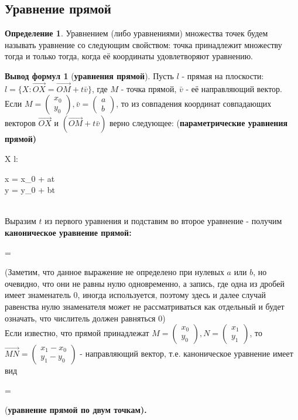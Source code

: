 \documentclass[a4paper, 12pt]{article}
\theoremstyle{definition}
\newtheorem*{definition}{Определение}
\newtheorem*{formulas}{Вывод формул}
\newenvironment{boxedalign*}
  {\begin{equation*}\begin{lrbox}{\boxedalignbox}$\begin{aligned}}
  {\end{aligned}$\end{lrbox}\fbox{\usebox{\boxedalignbox}}\end{equation*}}
\begin{document}
	\subsection{Уравнение прямой}
	\begin{definition}
		Уравнением (либо уравнениями) множества точек будем называть уравнение со следующим свойством: точка принадлежит множеству тогда и только тогда, когда её координаты удовлетворяют уравнению. 
	\end{definition}
	\begin{formulas}[\bfseries уравнения прямой\mdseries]


		Пусть $l$ - прямая на плоскости: $l = \{X: \overrightarrow{OX} = \overrightarrow{OM} + t\bar{v}\}$, где $M$ - точка прямой, $\bar{v}$ - её направляющий вектор. Если $M=\begin{pmatrix}x_{0}\\y_{0}\end{pmatrix},\bar{v}=\begin{pmatrix}a\\b\end{pmatrix}$, то из совпадения координат совпадающих векторов $\overrightarrow{OX}$ и $(\overrightarrow{OM}+t\bar{v})$ верно следующее: (\bfseries параметрические уравнения прямой\mdseries) \begin{boxedalign*}X \in l: \begin{cases}x = x_{0} + at \\ y = y_{0} + bt\end{cases}\end{boxedalign*}\\
		Выразим $t$ из первого уравнения и подставим во второе уравнение - получим \bfseries каноническое уравнение прямой\mdseries : \begin{boxedalign*} = \end{boxedalign*}
		(Заметим, что данное выражение не определено при нулевых $a$ или $b$, но очевидно, что они не равны нулю одновременно, а запись, где одна из дробей имеет знаменатель 0, иногда используется, поэтому здесь и далее случай равенства нулю знаменателя может не рассматриваться как отдельный и будет означать, что числитель должен равняться 0)\\
		Если известно, что прямой принадлежат $M = \begin{pmatrix}x_{0}\\y_{0}\end{pmatrix}, N = \begin{pmatrix}x_{1}\\y_{1}\end{pmatrix}$, то $\overrightarrow{MN} = \begin{pmatrix}x_{1} - x_{0}\\y_{1} - y_{0}\end{pmatrix}$ - направляющий вектор, т.е. каноническое уравнение имеет вид \begin{boxedalign*} = \end{boxedalign*}(\bfseries уравнение прямой по двум точкам\mdseries).\\

\end{formulas}
\end{document}
